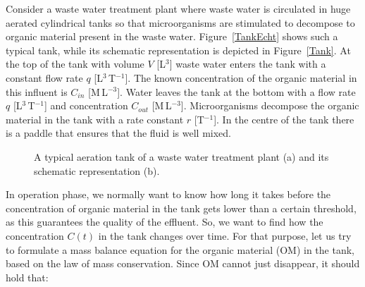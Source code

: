 \begin{example}\label{exampletank}
Consider a waste water treatment plant where waste water is circulated in huge aerated cylindrical tanks so that microorganisms are stimulated to decompose to organic material present in the waste water. Figure~\ref{TankEcht} shows such a typical tank, while its schematic representation is depicted in Figure~\ref{Tank}. At the top of the tank with volume $V$ [L$^3$] waste water enters the tank with a constant flow rate $q$ [L$^3$\,T$^{-1}$]. The known concentration of the organic material in this influent is $C_{in}$ [M\,L$^{-3}$]. Water leaves the tank at the bottom with a flow rate $q$ [L$^3$\,T$^{-1}$] and concentration  $C_{out}$ [M\,L$^{-3}$]. Microorganisms decompose the organic material in the tank with a rate constant $r$ [T$^{-1}$]. In the centre of the tank there is a paddle that ensures that the fluid is well mixed. 

\begin{figure}[H]
\centering
\centerline{
\hspace{0.1cm}
}
\caption{A typical aeration tank of a waste water treatment plant (a) and its schematic representation (b).} 

\end{figure}

In operation phase, we normally want to know how long it takes before the concentration of organic material in the tank gets lower than a certain threshold, as this guarantees the quality of the effluent. So, we want to find how the concentration $C(t)$ in the tank changes over time. For that purpose, let us try to formulate a mass balance equation for the organic material (OM) in the tank, based on the law of mass conservation. Since OM cannot just disappear, it should hold that:



\end{example}

